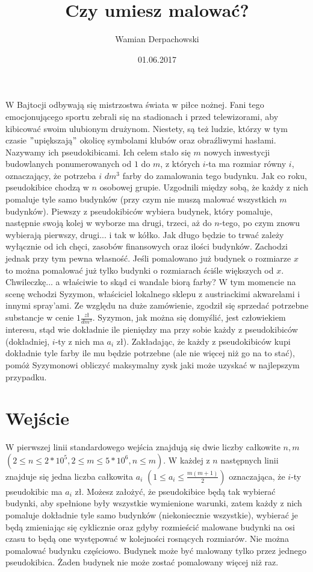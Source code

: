 \documentclass[zad,zawodnik,utf8]{sinol}
\title{Czy umiesz malować?}
\author{Wamian Derpachowski} %
\date{01.06.2017}
\begin{document}
\begin{tasktext}

	W Bajtocji odbywają się mistrzostwa świata w piłce nożnej. Fani tego emocjonującego sportu zebrali się na stadionach i przed telewizorami, aby kibicować swoim ulubionym drużynom. Niestety, są też ludzie, którzy w tym czasie $"$upiększają$"$ okolicę symbolami klubów oraz obraźliwymi hasłami. Nazywamy ich pseudokibicami. Ich celem stało się $m$ nowych inwestycji budowlanych ponumerowanych od $1$ do $m$, z których $i$-ta ma rozmiar równy $i$, oznaczający, że potrzeba $i$ $dm^3$ farby do zamalowania tego budynku. Jak co roku, pseudokibice chodzą w $n$ osobowej grupie. Uzgodnili między sobą, że każdy z nich pomaluje tyle samo budynków (przy czym nie muszą malować wszystkich $m$ budynków). Piewszy z pseudokibiców wybiera budynek, który pomaluje, następnie swoją kolej w wyborze ma drugi, trzeci, aż do $n$-tego, po czym znowu wybierają pierwszy, drugi... i tak w kółko. Jak długo będzie to trwać zależy wyłącznie od ich chęci, zasobów finansowych oraz ilości budynków. Zachodzi jednak przy tym pewna własność. Jeśli pomalowano już budynek o rozmiarze $x$ to można pomalować już tylko budynki o rozmiarach ściśle większych od $x$. Chwileczkę... a właściwie to skąd ci wandale biorą farby? W tym momencie na scenę wchodzi Syzymon, właściciel lokalnego sklepu z austriackimi akwarelami i innymi spray'ami. Ze względu na duże zamówienie, zgodził się sprzedać potrzebne substancje w cenie $1\frac{zł}{dm^3}$. Syzymon, jak można się domyślić, jest człowiekiem interesu, stąd wie dokładnie ile pieniędzy ma przy sobie każdy z pseudokibiców (dokładniej, $i$-ty z nich ma $a_i$ zł). Zakładając, że każdy z pseudokibiców kupi dokładnie tyle farby ile mu będzie potrzebne (ale nie więcej niż go na to stać), pomóż Syzymonowi obliczyć maksymalny zysk jaki może uzyskać w najlepszym przypadku.

  \section{Wejście}

	W pierwszej linii standardowego wejścia znajdują się dwie liczby całkowite $n, m$ $(2 \leq n \leq 2 * 10^5, 2 \leq m \leq 5 * 10^6, n \leq m)$.
	W każdej z $n$ następnych linii znajduje się jedna liczba całkowita $a_i$ $(1 \leq a_i \leq \frac{m(m+1)}{2})$ oznaczająca, że $i$-ty pseudokibic ma $a_i$ zł.
	Możesz założyć, że pseudokibice będą tak wybierać budynki, aby spełnione były wszystkie wymienione warunki, zatem każdy z nich pomaluje dokładnie tyle samo budynków (niekoniecznie wszystkie), wybierać je będą zmieniając się cyklicznie oraz gdyby rozmieścić malowane budynki na osi czasu to będą one występować w kolejności rosnących rozmiarów. Nie można pomalować budynku częściowo. Budynek może być malowany tylko przez jednego pseudokibica. Żaden budynek nie może zostać pomalowany więcej niż raz.



\end{tasktext}
\end{document}
